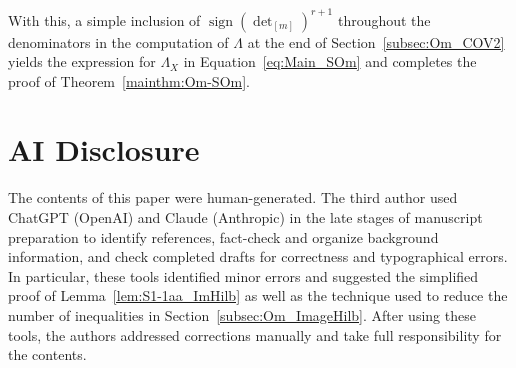 \documentclass[twoside]{amsart}
\theoremstyle{definition}
\theoremstyle{remark}
\numberwithin{equation}{section}
\newcommand{\sign}{\operatorname{sign}}
\begin{document}
With this, a simple inclusion of $\sign(\det\nolimits_{[m]})^{r+1}$ throughout the denominators in the computation of $\Lambda$ at the end of
Section~\ref{subsec:Om_COV2} yields the expression for $\Lambda_X$ in Equation~\eqref{eq:Main_SOm} and completes the proof of Theorem~\ref{mainthm:Om-SOm}.



\section*{AI Disclosure}

The contents of this paper were human-generated. The third author used ChatGPT (OpenAI) and Claude (Anthropic) in the late stages of manuscript preparation
to identify references, fact-check and organize background information, and check completed drafts for correctness and typographical errors.
In particular, these tools identified minor errors and suggested the simplified proof of Lemma~\ref{lem:S1-1aa_ImHilb} as well as the
technique used to reduce the number of inequalities in Section~\ref{subsec:Om_ImageHilb}. After using these tools, the authors
addressed corrections manually and take full responsibility for the contents.






\end{document}
